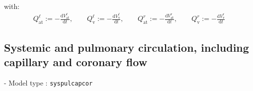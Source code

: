 \documentclass[a4paper,12pt]{report}
\begin{document}
with:
\begin{align}
Q_{\mathrm{at}}^{\ell} := -\frac{\mathrm{d}V_{\mathrm{at}}^{\ell}}{\mathrm{d}t}, \qquad
Q_{\mathrm{v}}^{\ell} := -\frac{\mathrm{d}V_{\mathrm{v}}^{\ell}}{\mathrm{d}t}, \qquad
Q_{\mathrm{at}}^{r} := -\frac{\mathrm{d}V_{\mathrm{at}}^{r}}{\mathrm{d}t}, \qquad
Q_{\mathrm{v}}^{r} := -\frac{\mathrm{d}V_{\mathrm{v}}^{r}}{\mathrm{d}t}\nonumber
\end{align}


\subsection{Systemic and pulmonary circulation, including capillary and coronary flow}

- Model type : \verb.syspulcapcor.\\
\end{document}
